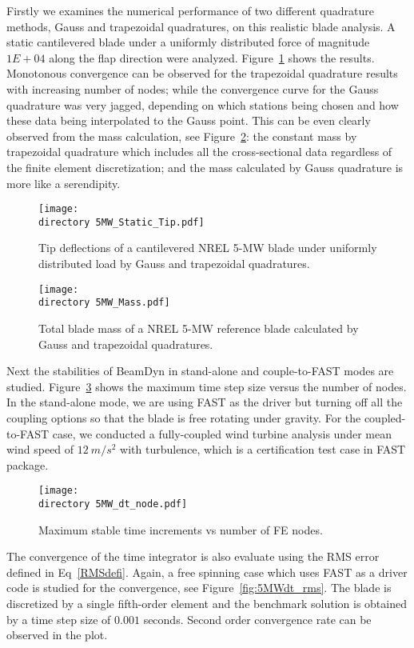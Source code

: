 \documentclass{aiaa-tc}
\def\directory{EPSF/}
\begin{document}
Firstly we examines the numerical performance of two different quadrature methods, Gauss and trapezoidal quadratures, on this realistic blade analysis. A static cantilevered blade under a uniformly distributed force of magnitude $1E+04$ along the flap direction were analyzed. Figure~\ref{fig:5MWStaticTip} shows the results. Monotonous convergence can be observed for the trapezoidal quadrature results with increasing number of nodes; while the convergence curve for the Gauss quadrature was very jagged, depending on which stations being chosen and how these data being interpolated to the Gauss point. This can be even clearly observed from the mass calculation, see Figure~\ref{fig:5MWMass}: the constant mass by trapezoidal quadrature which includes all the cross-sectional data regardless of the finite element discretization; and the mass calculated by Gauss quadrature is more like a serendipity.
\begin{figure}
\centering
\texttt{[image: \\directory 5MW\_Static\_Tip.pdf]}
\caption{Tip deflections of a cantilevered NREL 5-MW blade under uniformly distributed load by Gauss and trapezoidal quadratures.} 
\label{fig:5MWStaticTip}
\end{figure}

\begin{figure}
    \centering
\texttt{[image: \\directory  5MW\_Mass.pdf]}
\caption{Total blade mass of a NREL 5-MW reference blade calculated by Gauss and trapezoidal quadratures.}
\label{fig:5MWMass}
\end{figure} 

Next the stabilities of BeamDyn in stand-alone and couple-to-FAST modes are studied. Figure~\ref{fig:5MWdt_node} shows the maximum time step size versus the number of nodes. In the stand-alone mode, we are using FAST as the driver but turning off all the coupling options so that the blade is free rotating under gravity. For the coupled-to-FAST case, we conducted a fully-coupled wind turbine analysis under mean wind speed of $12~m/s^2$ with turbulence, which is a certification test case in FAST package. 

\begin{figure}
    \centering
\texttt{[image: \\directory  5MW\_dt\_node.pdf]}
\caption{Maximum stable time increments vs number of FE nodes.}
\label{fig:5MWdt_node}
\end{figure} 

The convergence of the time integrator is also evaluate using the RMS error defined in Eq~\eqref{RMSdefi}. Again, a free spinning case which uses FAST as a driver code is studied for the convergence, see Figure~\ref{fig:5MWdt_rms}. The blade is discretized by a single fifth-order element and the benchmark solution is obtained by a time step size of $0.001$ seconds. Second order convergence rate can be observed in the plot.
\end{document}
